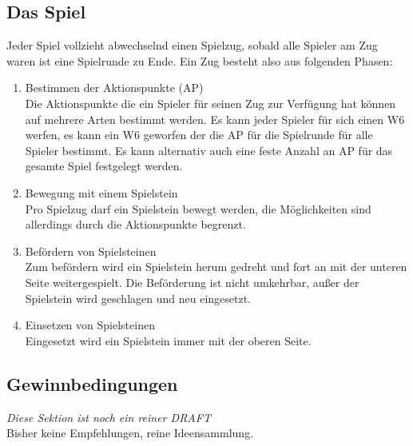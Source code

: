 \documentclass{article}
\begin{document}
	
\subsection{Das Spiel}

	Jeder Spiel vollzieht abwechselnd einen Spielzug, sobald alle Spieler am Zug waren
	ist eine Spielrunde zu Ende. Ein Zug besteht also aus folgenden Phasen:
	
	\begin{enumerate}
	\item Bestimmen der Aktionspunkte (AP) \\
		  Die Aktionspunkte die ein Spieler für seinen Zug zur Verfügung hat können auf mehrere Arten bestimmt werden.
		  Es kann jeder Spieler für sich einen W6 werfen, es kann ein W6 geworfen der die AP für die Spielrunde für alle Spieler bestimmt.
		  Es kann alternativ auch eine feste Anzahl an AP für das gesamte Spiel festgelegt werden.
		  
	\item Bewegung mit einem Spielstein \\
		  Pro Spielzug darf ein Spielstein bewegt werden, die Möglichkeiten sind allerdings durch die Aktionspunkte begrenzt.
		   
	\item Befördern von Spielsteinen \\
		  Zum befördern wird ein Spielstein herum gedreht und fort an mit der unteren Seite weitergespielt.
		  Die Beförderung ist nicht umkehrbar, außer der Spielstein wird geschlagen und neu eingesetzt.
		  
	\item Einsetzen von Spielsteinen \\
		  Eingesetzt wird ein Spielstein immer mit der oberen Seite.
	\end{enumerate}


\subsection{Gewinnbedingungen}

	\textit{Diese Sektion ist noch ein reiner DRAFT} \\
	Bisher keine Empfehlungen, reine Ideensammlung.
	
\end{document}
